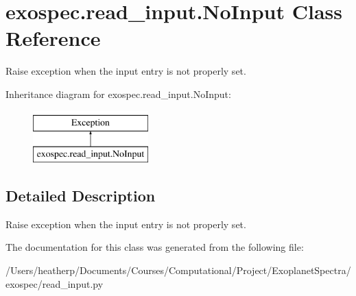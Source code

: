 \hypertarget{classexospec_1_1read__input_1_1_no_input}{}\section{exospec.\+read\+\_\+input.\+No\+Input Class Reference}
\label{classexospec_1_1read__input_1_1_no_input}


Raise exception when the input entry is not properly set.  


Inheritance diagram for exospec.\+read\+\_\+input.\+No\+Input\+:\begin{figure}[H]
\begin{center}
\leavevmode
\includegraphics[height=2.000000cm]{classexospec_1_1read__input_1_1_no_input}
\end{center}
\end{figure}


\subsection{Detailed Description}
Raise exception when the input entry is not properly set. 

The documentation for this class was generated from the following file\+:\begin{DoxyCompactItemize}
\item 
/\+Users/heatherp/\+Documents/\+Courses/\+Computational/\+Project/\+Exoplanet\+Spectra/exospec/read\+\_\+input.\+py\end{DoxyCompactItemize}
